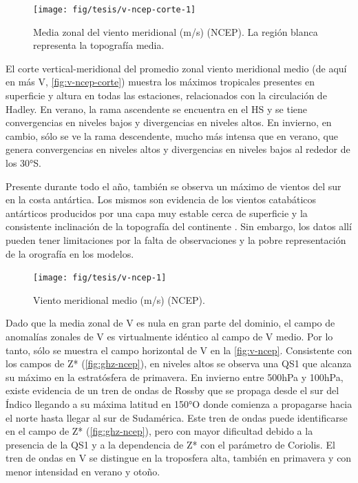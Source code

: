 \documentclass[spanish,a4paper,12pt,oneside]{book}
\begin{document}
\begin{figure}
\texttt{[image: fig/tesis/v-ncep-corte-1]} \caption{Media zonal del viento meridional (m/s) (NCEP). La región blanca representa la topografía media.}\label{fig:v-ncep-corte}
\end{figure}

El corte vertical-meridional del promedio zonal viento meridional medio
(de aquí en más V, \autoref{fig:v-ncep-corte}) muestra los máximos
tropicales presentes en superficie y altura en todas las estaciones,
relacionados con la circulación de Hadley. En verano, la rama ascendente
se encuentra en el HS y se tiene convergencias en niveles bajos y
divergencias en niveles altos. En invierno, en cambio, sólo se ve la
rama descendente, mucho más intensa que en verano, que genera
convergencias en niveles altos y divergencias en niveles bajos al
rededor de los 30°S.

Presente durante todo el año, también se observa un máximo de vientos
del sur en la costa antártica. Los mismos son evidencia de los vientos
catabáticos antárticos producidos por una capa muy estable cerca de
superficie y la consistente inclinación de la topografía del continente
\citep{King1997}. Sin embargo, los datos allí pueden tener limitaciones
por la falta de observaciones y la pobre representación de la orografía
en los modelos.

\begin{landscape}\begin{figure}

{\centering \texttt{[image: fig/tesis/v-ncep-1]} 

}

\caption{Viento meridional medio (m/s) (NCEP).}\label{fig:v-ncep}
\end{figure}
\end{landscape}

Dado que la media zonal de V es nula en gran parte del dominio, el campo
de anomalías zonales de V es virtualmente idéntico al campo de V medio.
Por lo tanto, sólo se muestra el campo horizontal de V en la
\autoref{fig:v-ncep}. Consistente con los campos de Z*
(\autoref{fig:ghz-ncep}), en niveles altos se observa una QS1 que
alcanza su máximo en la estratósfera de primavera. En invierno entre
500hPa y 100hPa, existe evidencia de un tren de ondas de Rossby que se
propaga desde el sur del Índico llegando a su máxima latitud en 150°O
donde comienza a propagarse hacia el norte hasta llegar al sur de
Sudamérica. Este tren de ondas puede identificarse en el campo de Z*
(\autoref{fig:ghz-ncep}), pero con mayor dificultad debido a la
presencia de la QS1 y a la dependencia de Z* con el parámetro de
Coriolis. El tren de ondas en V se distingue en la troposfera alta,
también en primavera y con menor intensidad en verano y otoño.
\end{document}
